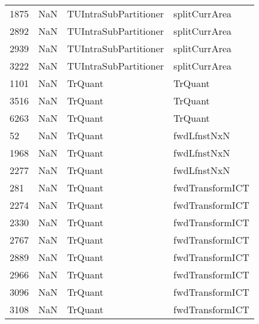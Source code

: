 \begin{tabular}{llll}
1875 &                   NaN &      TUIntraSubPartitioner &                             splitCurrArea \\
2892 &                   NaN &      TUIntraSubPartitioner &                             splitCurrArea \\
2939 &                   NaN &      TUIntraSubPartitioner &                             splitCurrArea \\
3222 &                   NaN &      TUIntraSubPartitioner &                             splitCurrArea \\
1101 &                   NaN &                    TrQuant &                                   TrQuant \\
3516 &                   NaN &                    TrQuant &                                   TrQuant \\
6263 &                   NaN &                    TrQuant &                                   TrQuant \\
52   &                   NaN &                    TrQuant &                               fwdLfnstNxN \\
1968 &                   NaN &                    TrQuant &                               fwdLfnstNxN \\
2277 &                   NaN &                    TrQuant &                               fwdLfnstNxN \\
281  &                   NaN &                    TrQuant &                           fwdTransformICT \\
2274 &                   NaN &                    TrQuant &                           fwdTransformICT \\
2330 &                   NaN &                    TrQuant &                           fwdTransformICT \\
2767 &                   NaN &                    TrQuant &                           fwdTransformICT \\
2889 &                   NaN &                    TrQuant &                           fwdTransformICT \\
2966 &                   NaN &                    TrQuant &                           fwdTransformICT \\
3096 &                   NaN &                    TrQuant &                           fwdTransformICT \\
3108 &                   NaN &                    TrQuant &                           fwdTransformICT \\

\end{tabular}
